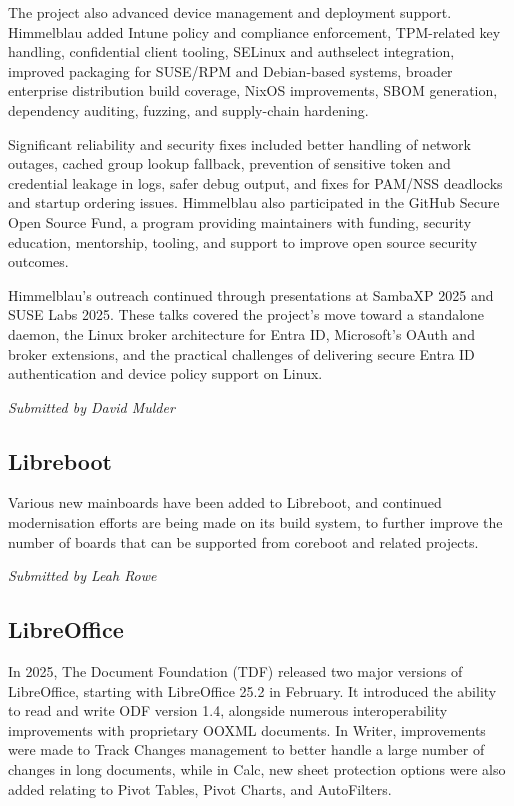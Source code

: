 \documentclass[a4paper]{report}
\begin{document}
The project also advanced device management and deployment support. Himmelblau added Intune policy and compliance enforcement, TPM-related key handling, confidential client tooling, SELinux and authselect integration, improved packaging for SUSE/RPM and Debian-based systems, broader enterprise distribution build coverage, NixOS improvements, SBOM generation, dependency auditing, fuzzing, and supply-chain hardening.

Significant reliability and security fixes included better handling of network outages, cached group lookup fallback, prevention of sensitive token and credential leakage in logs, safer debug output, and fixes for PAM/NSS deadlocks and startup ordering issues. Himmelblau also participated in the GitHub Secure Open Source Fund, a program providing maintainers with funding, security education, mentorship, tooling, and support to improve open source security outcomes.

Himmelblau's outreach continued through presentations at SambaXP 2025 and SUSE Labs 2025. These talks covered the project's move toward a standalone daemon, the Linux broker architecture for Entra ID, Microsoft's OAuth and broker extensions, and the practical challenges of delivering secure Entra ID authentication and device policy support on Linux.

{\em Submitted by David Mulder}

\subsection{Libreboot}

Various new mainboards have been added to Libreboot, and continued modernisation efforts are being made on its build system, to further improve the number of boards that can be supported from coreboot and related projects.

{\em Submitted by Leah Rowe}

\subsection{LibreOffice}

In 2025, The Document Foundation (TDF) released two major versions of LibreOffice, starting with LibreOffice 25.2 in February. It introduced the ability to read and write ODF version 1.4, alongside numerous interoperability improvements with proprietary OOXML documents. In Writer, improvements were made to Track Changes management to better handle a large number of changes in long documents, while in Calc, new sheet protection options were also added relating to Pivot Tables, Pivot Charts, and AutoFilters.
\end{document}
